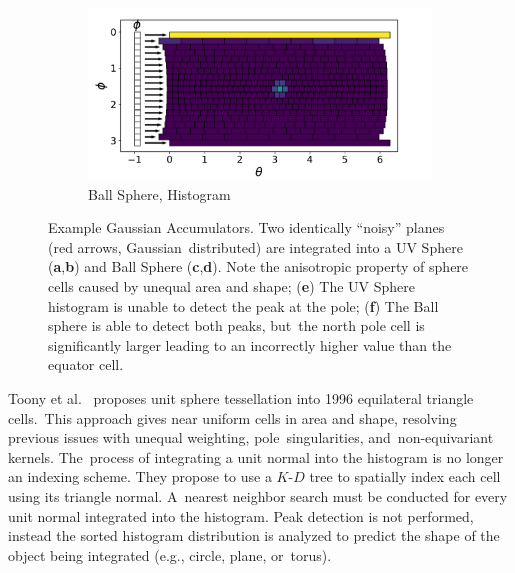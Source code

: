 \begin{figure}[H]
  \begin{subfigure}[t]{.49\linewidth}
    \centering\includegraphics[trim=0.1cm 0cm 0.99cm 0.6cm,width=.99\linewidth]{chapter_3_polylidar3d/imgs/ref_ga/strips_histogram.pdf}
    \caption{Ball Sphere, Histogram\label{fig:ch3_bg_ga_f}}\vspace{6pt}
  \end{subfigure}
  \caption[Example Gaussian Accumulators]{Example Gaussian Accumulators. Two identically ``noisy'' planes (red arrows, Gaussian~distributed) are integrated into a UV Sphere (\textbf{a},\textbf{b}) and Ball Sphere (\textbf{c},\textbf{d}). Note the anisotropic property of sphere cells caused by unequal area and shape; (\textbf{e}) The UV Sphere histogram is unable to detect the peak at the pole; (\textbf{f}) The Ball sphere is able to detect both peaks, but~the north pole cell is significantly larger
  leading to an incorrectly higher value than the equator cell.}\label{fig:ch3_bg_ga}
\end{figure}


Toony et al.~\cite{toony_describing_2015} proposes unit sphere tessellation into 1996 equilateral triangle cells.~This approach gives near uniform cells in area and shape, resolving previous issues with unequal weighting, pole~singularities, and~non-equivariant kernels. The~process of integrating a unit normal into the histogram is no longer an indexing scheme. They propose to use a $K$-$D$ tree to spatially index each cell using its triangle normal.  A~nearest neighbor search must be conducted for every unit normal integrated into the histogram. Peak detection is not performed, instead the sorted histogram distribution is analyzed to predict the shape of the object being integrated (e.g., circle, plane, or~torus). 

